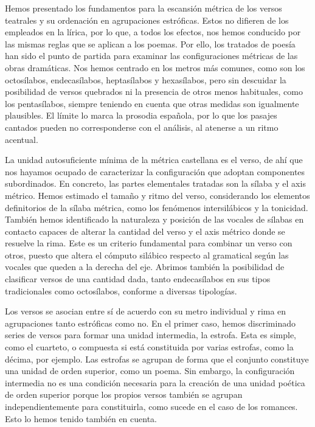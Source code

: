 Hemos presentado los fundamentos para la escansión métrica de los versos teatrales y su  ordenación en agrupaciones estróficas. Estos no difieren de los empleados en la lírica, por lo que, a todos los efectos, nos hemos conducido por las mismas reglas que se aplican a los poemas. Por ello, los tratados de poesía han sido el punto de partida para examinar las configuraciones métricas de las obras dramáticas. Nos hemos centrado en los metros más comunes, como son los octosílabos, endecasílabos, heptasílabos y hexasílabos, pero sin descuidar la posibilidad de versos quebrados ni la presencia de otros menos habituales, como los pentasílabos, siempre teniendo en cuenta que otras medidas son igualmente plausibles. El límite lo marca la prosodia española, por lo que los pasajes cantados pueden no corresponderse con el análisis, al atenerse a un ritmo acentual.

La unidad autosuficiente mínima de la métrica castellana es el verso, de ahí que nos hayamos ocupado de caracterizar la configuración que adoptan componentes subordinados. En concreto, las partes elementales tratadas son la sílaba y el axis métrico. Hemos estimado el tamaño y ritmo del verso, considerando los elementos definitorios de la sílaba métrica, como los fenómenos intersilábicos y la tonicidad. También hemos identificado la naturaleza y posición de las vocales de sílabas en contacto capaces de alterar la cantidad del verso y el axis métrico donde se resuelve la rima. Este es un criterio fundamental para combinar un verso con otros, puesto que altera el cómputo silábico respecto al gramatical según las vocales que queden a la derecha del eje. Abrimos también la posibilidad de clasificar versos de una cantidad dada, tanto endecasílabos en sus tipos tradicionales como octosílabos, conforme a diversas tipologías.

Los versos se asocian entre sí de acuerdo con su metro individual y rima  en agrupaciones tanto estróficas como no. En el primer caso, hemos discriminado series de versos para formar una unidad intermedia, la estrofa. Esta es simple, como el cuarteto, o compuesta si está constituida por varias estrofas, como la décima, por ejemplo. Las estrofas se agrupan de forma que el conjunto constituye una unidad de orden superior, como un poema. Sin embargo, la configuración intermedia no es una condición necesaria para la creación de una unidad poética de orden superior porque los propios versos también se agrupan independientemente para constituirla, como sucede en el caso de los romances. Esto lo hemos tenido también en cuenta.

